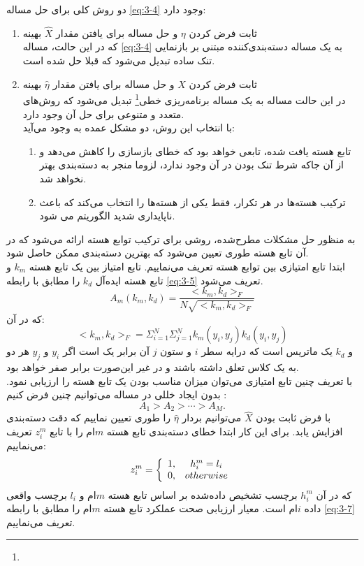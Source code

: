 \documentclass[12pt,twocolumn]{article}
\newcommand{\enfootnote}[1]{\footnote{\lr{#1}}}
\begin{document}
دو روش کلی برای حل مساله \eqref{eq:3-4} وجود دارد:
\begin{enumerate}
\item ثابت فرض ‌کردن $\eta$ و حل مساله برای یافتن مقدار $\hat{X}$ بهینه \\
که در این حالت، مساله \eqref{eq:3-4} به یک مساله دسته‌بندی‌کننده مبتنی بر بازنمایی تنک ساده تبدیل می‌شود که قبلا حل شده است.
\item ثابت فرض کردن $\hat{X}$ و حل مساله برای یافتن مقدار $\hat{\eta}$ بهینه \\
در این حالت مساله به یک مساله برنامه‌ریزی خطی\enfootnote{Linear Programming} تبدیل می‌شود که روش‌های متعدد و متنوعی برای حل آن وجود دارد.
\\
با انتخاب این روش، دو مشکل عمده به وجود می‌آید:
\begin{enumerate}
\item تابع هسته یافت شده، تابعی خواهد بود که خطای بازسازی را کاهش می‌دهد و از آن جاکه شرط تنک بودن در آن وجود ندارد، لزوما منجر به دسته‌بندی بهتر نخواهد شد.
\item ترکیب هسته‌ها در هر تکرار، فقط یکی از هسته‌ها را انتخاب می‌کند که باعث ناپایداری شدید الگوریتم می شود.
\end{enumerate}
\end{enumerate}
به منظور حل مشکلات مطرح‌شده، روشی برای ترکیب توابع هسته ارائه می‌شود که در آن تابع هسته طوری تعیین می‌شود که بهترین دسته‌بندی ممکن حاصل شود.
\\
ابتدا تابع امتیازی بین توابع هسته تعریف می‌نماییم. تابع امتیاز بین یک تابع هسته $k_m$ و تابع هسته ایده‌آل $k_d$ را مطابق با رابطه \eqref{eq:3-5} تعریف می‌شود.
\begin{equation}
A_m(k_m, k_d) = \frac{<k_m,k_d>_F}{N\sqrt{<k_m, k_d>_F}}
\label{eq:3-5}
\end{equation}
که در آن:
\[<k_m,k_d>_F = \Sigma_{i=1}^N\Sigma_{j=1}^N k_m(y_i,y_j)k_d(y_i,y_j)\]
و $k_d$ یک ماتریس است که درایه سطر $i$ و ستون $j$ آن برابر یک است اگر $y_i$ و $y_j$ هر دو به یک کلاس تعلق داشته باشند و در غیر این‌صورت برابر صفر خواهد بود.
\\
با تعریف چنین تابع امتیازی می‌توان میزان مناسب بودن یک تابع هسته را ارزیابی نمود. بدون ایجاد خللی در مساله می‌توانیم چنین فرض کنیم :
\[
A_1 > A_2 > \cdots > A_M.
\]
با فرض ثابت بودن $\hat{X}$ می‌توانیم بردار $\hat{\eta}$ را طوری تعیین نماییم که دقت دسته‌بندی افزایش یابد. برای این کار ابتدا خطای دسته‌بندی تابع هسته $m$ام را با تابع $z_i^m$ تعریف می‌نماییم:
\begin{equation}
z_i^m = \left\lbrace \begin{array}{c c}
1, & h_i^m = l_i \\
0, & otherwise
\end{array}\right.
\label{eq:3-6}
\end{equation}
که در آن $h_i^m$ برچسب تشخیص داده‌شده بر اساس تابع هسته $m$ام و $l_i$ برچسب واقعی داده‌ $i$ام است.
معیار ارزیابی صحت عملکرد تابع هسته $m$ام را مطابق با رابطه \eqref{eq:3-7} تعریف می‌نماییم.
\end{document}
